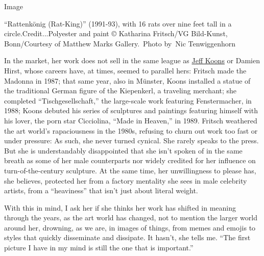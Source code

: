 Image

``Rattenkönig (Rat-King)'' (1991-93), with 16 rats over nine feet tall
in a circle.Credit...Polyester and paint © Katharina Fritsch/VG
Bild-Kunst, Bonn/Courtesy of Matthew Marks Gallery.~Photo by~Nic
Tenwiggenhorn

In the market, her work does not sell in the same league as
\href{https://www.nytimes3xbfgragh.onion/2018/04/17/t-magazine/east-village-artist-jeff-koons-peter-halley.html}{Jeff
Koons} or Damien Hirst, whose careers have, at times, seemed to parallel
hers: Fritsch made the Madonna in 1987; that same year, also in Münster,
Koons installed a statue of the traditional German figure of the
Kiepenkerl, a traveling merchant; she completed ``Tischgesellschaft,''
the large-scale work featuring Fenstermacher, in 1988; Koons debuted his
series of sculptures and paintings featuring himself with his lover, the
porn star Cicciolina, ``Made in Heaven,'' in 1989. Fritsch weathered the
art world's rapaciousness in the 1980s, refusing to churn out work too
fast or under pressure: As such, she never turned cynical. She rarely
speaks to the press. But she is understandably disappointed that she
isn't spoken of in the same breath as some of her male counterparts nor
widely credited for her influence on turn-of-the-century sculpture. At
the same time, her unwillingness to please has, she believes, protected
her from a factory mentality she sees in male celebrity artists, from a
``heaviness'' that isn't just about literal weight.

With this in mind, I ask her if she thinks her work has shifted in
meaning through the years, as the art world has changed, not to mention
the larger world around her, drowning, as we are, in images of things,
from memes and emojis to styles that quickly disseminate and dissipate.
It hasn't, she tells me. ``The first picture I have in my mind is still
the one that is important.''

